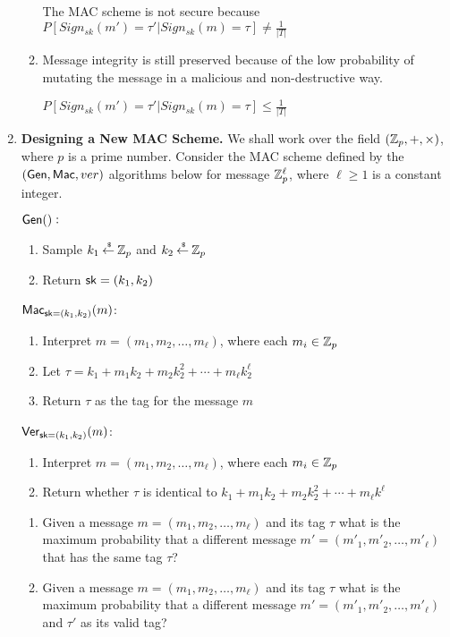 \documentclass[11pt]{article}
\newcommand{\nextoddpage}{\checkoddpage\ifoddpage{\ \newpage\ \newpage}\else{\ \newpage}\fi}
\begin{document}
\begin{enumerate}
\begin{enumerate}
  		The MAC scheme is not secure because $P[Sign_{sk}(m') = \tau' | Sign_{sk}(m) = \tau] \neq \frac{1}{|T|}$
  \item Message integrity is still preserved because of the low probability of mutating the message in a malicious and non-destructive way.
  
  		$P[Sign_{sk}(m') = \tau' | Sign_{sk}(m) = \tau] \leq \frac{1}{|T|}$
  \end{enumerate} 


  
\nextoddpage 
\item {\bfseries Designing a New MAC Scheme.}
  We shall work over the field $({\mathbb Z}_p,+,\times)$, where $p$ is a prime number. 
  Consider the MAC scheme defined by the $(\mathsf{Gen},\mathsf{Mac},ver)$ algorithms below for message ${\mathbb Z}_p^\ell$, where $\ell\geq 1$ is a constant integer. 
  
  \begin{boxedalgo}
  $\mathsf{Gen}():$
  \begin{enumerate}
  \item Sample $k_1 \mathbin{\stackrel{\mbox{\,\tiny \$}}{\gets}} {\mathbb Z}_p$ and $k_2 \mathbin{\stackrel{\mbox{\,\tiny \$}}{\gets}}{\mathbb Z}_p$ 
  \item Return $\mathsf{sk} = (k_1,k_2)$
  \end{enumerate}
  
  $\mathsf{Mac}_{\mathsf{sk}=(k_1,k_2)}(m)$: 
  \begin{enumerate}
  \item Interpret $m = (m_1,m_2,\dotsc,m_\ell)$, where each $m_i\in{\mathbb Z}_p$ 
  \item Let $\tau = k_1 + m_1k_2 + m_2k_2^2 + \dotsi + m_\ell k_2^\ell$ 
  \item Return $\tau$ as the tag for the message $m$ 
  \end{enumerate} 
  
  $\mathsf{Ver}_{\mathsf{sk}=(k_1,k_2)}(m)$:
  \begin{enumerate}
  \item Interpret $m=(m_1,m_2,\dotsc,m_\ell)$, where each $m_i\in{\mathbb Z}_p$
  \item Return whether $\tau$ is identical to $k_1+m_1k_2 + m_2k_2^2 + \dotsi + m_\ell k^\ell$ 
  \end{enumerate}
  \end{boxedalgo}
  
  
  \begin{enumerate}
  \item Given a message $m=(m_1,m_2,\dotsc,m_\ell)$ and its tag $\tau$ what is the maximum probability that a different message $m' =(m'_1,m'_2,\dotsc,m'_\ell)$ that has the same tag $\tau$? 
  \item Given a message $m=(m_1,m_2,\dotsc,m_\ell)$ and its tag $\tau$ what is the maximum probability that a different message $m' =(m'_1,m'_2,\dotsc,m'_\ell)$ and $\tau'$ as its valid tag? 
  \end{enumerate} 
  

\end{enumerate}
\end{document}
